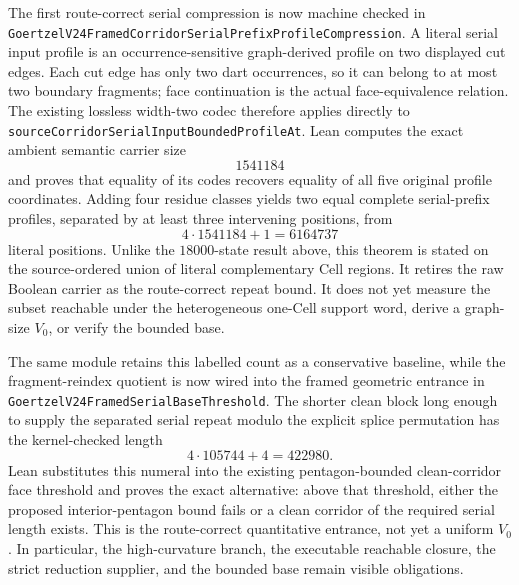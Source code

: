 \documentclass[11pt]{article}
\theoremstyle{definition}
\begin{document}
The first route-correct serial compression is now machine checked in
\texttt{GoertzelV24FramedCorridorSerialPrefixProfileCompression}.  A literal
serial input profile is an occurrence-sensitive graph-derived profile on two
displayed cut edges.  Each cut edge has only two dart occurrences, so it can
belong to at most two boundary fragments; face continuation is the actual
face-equivalence relation.  The existing lossless width-two codec therefore
applies directly to
\texttt{sourceCorridorSerialInputBoundedProfileAt}.  Lean computes the exact
ambient semantic carrier size
\[
  1541184
\]
and proves that equality of its codes recovers equality of all five original
profile coordinates.  Adding four residue classes yields two equal complete
serial-prefix profiles, separated by at least three intervening positions,
from
\[
  4\cdot1541184+1=6164737
\]
literal positions.  Unlike the $18000$-state result above, this theorem is
stated on the source-ordered union of literal complementary Cell regions.
It retires the raw Boolean carrier as the route-correct repeat bound.  It does
not yet measure the subset reachable under the heterogeneous one-Cell support
word, derive a graph-size $V_0$, or verify the bounded base.

The same module retains this labelled count as a conservative baseline, while
the fragment-reindex quotient is now wired into the framed geometric entrance
in \texttt{GoertzelV24FramedSerialBaseThreshold}.  The shorter clean block
long enough to supply the separated serial repeat modulo the explicit splice
permutation has the kernel-checked length
\[
  4\cdot105744+4=422980.
\]
Lean substitutes this numeral into the existing pentagon-bounded
clean-corridor face threshold and proves the exact alternative: above that
threshold, either the proposed interior-pentagon bound fails or a clean
corridor of the required serial length exists.  This is the route-correct
quantitative entrance, not yet a uniform $V_0$.  In particular, the
high-curvature branch, the executable reachable closure, the strict reduction
supplier, and the bounded base remain visible obligations.
\end{document}
